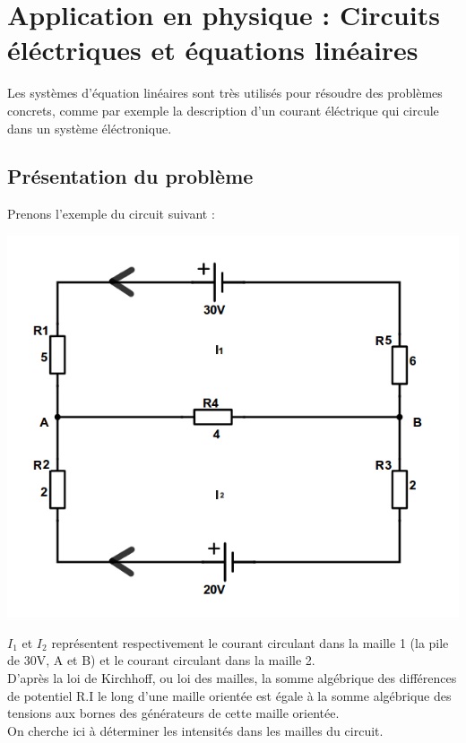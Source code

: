 \documentclass[a4paper,12pt]{report}
\begin{document}
\newpage
\chapter{Application en physique : Circuits éléctriques et équations linéaires}
Les systèmes d’équation linéaires sont très utilisés pour résoudre des problèmes concrets, comme par exemple la description d’un courant éléctrique qui circule dans un système éléctronique.
\section{Présentation du problème}
Prenons l'exemple du circuit suivant :\\
\begin{center}
\includegraphics[scale=0.38]{kirchhoff.png}
\end{center}

$I_{1}$ et $I_{2}$ représentent respectivement le courant circulant dans la maille 1 (la pile de 30V, A et B) et le courant circulant dans la maille 2.\\

D’après la loi de Kirchhoff, ou loi des mailles, la somme algébrique des différences de potentiel R.I le long d’une maille orientée est égale à la somme algébrique des tensions aux bornes des générateurs de cette maille orientée.\\

On cherche ici à déterminer les intensités dans les mailles du circuit.
\end{document}
